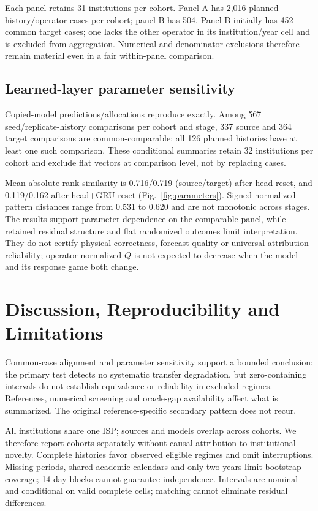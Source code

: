 \documentclass[conference]{IEEEtran}
\begin{document}
Each panel retains 31 institutions per cohort. Panel A has 2,016 planned history/operator cases per cohort; panel B has 504. Panel B initially has 452 common target cases; one lacks the other operator in its institution/year cell and is excluded from aggregation. Numerical and denominator exclusions therefore remain material even in a fair within-panel comparison.

\subsection{Learned-layer parameter sensitivity}
Copied-model predictions/allocations reproduce exactly. Among 567 seed/replicate-history comparisons per cohort and stage, 337 source and 364 target comparisons are common-comparable; all 126 planned histories have at least one such comparison. These conditional summaries retain 32 institutions per cohort and exclude flat vectors at comparison level, not by replacing cases.

Mean absolute-rank similarity is 0.716/0.719 (source/target) after head reset, and 0.119/0.162 after head+GRU reset (Fig.~\ref{fig:parameters}). Signed normalized-pattern distances range from 0.531 to 0.620 and are not monotonic across stages. The results support parameter dependence on the comparable panel, while retained residual structure and flat randomized outcomes limit interpretation. They do not certify physical correctness, forecast quality or universal attribution reliability; operator-normalized $Q$ is not expected to decrease when the model and its response game both change.



\section{Discussion, Reproducibility and Limitations}
Common-case alignment and parameter sensitivity support a bounded conclusion: the primary test detects no systematic transfer degradation, but zero-containing intervals do not establish equivalence or reliability in excluded regimes. References, numerical screening and oracle-gap availability affect what is summarized. The original reference-specific secondary pattern does not recur.

All institutions share one ISP; sources and models overlap across cohorts. We therefore report cohorts separately without causal attribution to institutional novelty. Complete histories favor observed eligible regimes and omit interruptions. Missing periods, shared academic calendars and only two years limit bootstrap coverage; 14-day blocks cannot guarantee independence. Intervals are nominal and conditional on valid complete cells; matching cannot eliminate residual differences.
\end{document}

